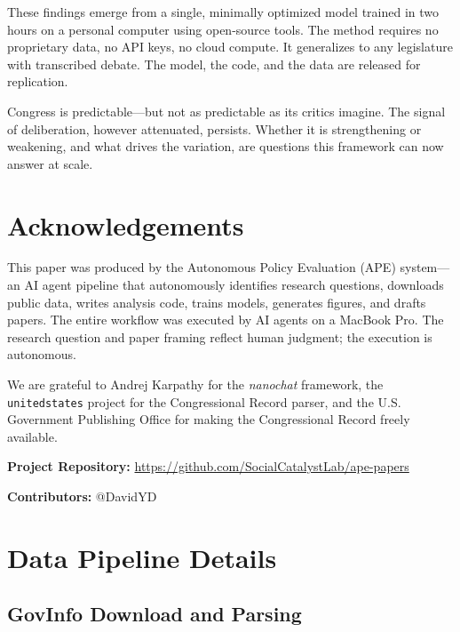 \documentclass[12pt]{article}
\begin{document}
These findings emerge from a single, minimally optimized model trained in two hours on a personal computer using open-source tools. The method requires no proprietary data, no API keys, no cloud compute. It generalizes to any legislature with transcribed debate. The model, the code, and the data are released for replication.

Congress is predictable---but not as predictable as its critics imagine. The signal of deliberation, however attenuated, persists. Whether it is strengthening or weakening, and what drives the variation, are questions this framework can now answer at scale.


\section*{Acknowledgements}

This paper was produced by the Autonomous Policy Evaluation (APE) system---an AI agent pipeline that autonomously identifies research questions, downloads public data, writes analysis code, trains models, generates figures, and drafts papers. The entire workflow was executed by AI agents on a MacBook Pro. The research question and paper framing reflect human judgment; the execution is autonomous.

We are grateful to Andrej Karpathy for the \textit{nanochat} framework, the \texttt{unitedstates} project for the Congressional Record parser, and the U.S. Government Publishing Office for making the Congressional Record freely available.

\noindent\textbf{Project Repository:} \url{https://github.com/SocialCatalystLab/ape-papers}

\noindent\textbf{Contributors:} @DavidYD

\label{apep_main_text_end}
\newpage


\newpage
\appendix

\section{Data Pipeline Details}
\label{app:data}

\subsection{GovInfo Download and Parsing}
\end{document}
